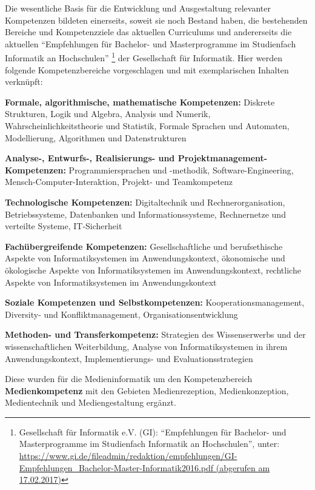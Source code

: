 Die wesentliche Basis für die Entwicklung und Ausgestaltung relevanter
Kompetenzen bildeten einerseits, soweit sie noch Bestand haben, die
bestehenden Bereiche und Kompetenzziele das aktuellen Curriculums und
andererseits die aktuellen ``Empfehlungen für Bachelor- und
Masterprogramme im Studienfach Informatik an Hochschulen'' \footnote{Gesellschaft
  für Informatik e.V. (GI): ``Empfehlungen für Bachelor- und
  Masterprogramme im Studienfach Informatik an Hochschulen'', unter:
  \href{https://www.gi.de/fileadmin/redaktion/empfehlungen/GI-Empfehlungen_Bachelor-Master-Informatik2016.pdf}{https://www.gi.de/fileadmin/redaktion/empfehlungen/GI-Empfehlungen\_Bachelor-Master-Informatik2016.pdf
  (abgerufen am 17.02.2017)}} der Gesellschaft für Informatik. Hier
werden folgende Kompetenzbereiche vorgeschlagen und mit exemplarischen
Inhalten verknüpft:

\textbf{Formale, algorithmische, mathematische Kompetenzen:} Diskrete
Strukturen, Logik und Algebra, Analysis und Numerik,
Wahrscheinlichkeitstheorie und Statistik, Formale Sprachen und
Automaten, Modellierung, Algorithmen und Datenstrukturen

\textbf{Analyse-, Entwurfs-, Realisierungs- und
Projektmanagement-Kompetenzen:} Programmiersprachen und -methodik,
Software-Engineering, Mensch-Computer-Interaktion, Projekt- und
Teamkompetenz

\textbf{Technologische Kompetenzen:} Digitaltechnik und
Rechnerorganisation, Betriebssysteme, Datenbanken und
Informationssysteme, Rechnernetze und verteilte Systeme, IT-Sicherheit

\textbf{Fachübergreifende Kompetenzen:} Gesellschaftliche und
berufsethische Aspekte von Informatiksystemen im Anwendungskontext,
ökonomische und ökologische Aspekte von Informatiksystemen im
Anwendungskontext, rechtliche Aspekte von Informatiksystemen im
Anwendungskontext

\textbf{Soziale Kompetenzen und Selbstkompetenzen:}
Kooperationsmanagement, Diversity- und Konfliktmanagement,
Organisationsentwicklung

\textbf{Methoden- und Transferkompetenz:} Strategien des Wissenserwerbs
und der wissenschaftlichen Weiterbildung, Analyse von Informatiksystemen
in ihrem Anwendungskontext, Implementierungs- und Evaluationsstrategien

Diese wurden für die Medieninformatik um den Kompetenzbereich
\textbf{Medienkompetenz} mit den Gebieten Medienrezeption,
Medienkonzeption, Medientechnik und Mediengestaltung ergänzt.

